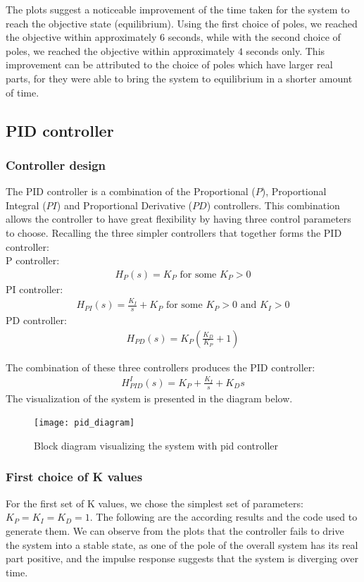 \documentclass [12pt,letterpaper]{exam}
\begin{document}


The plots suggest a noticeable improvement of the time taken for the system to reach the objective state (equilibrium). Using the first choice of poles, we reached the objective within approximately $6$ seconds, while with the second choice of poles, we reached the objective within approximately $4$ seconds only. This improvement can be attributed to the choice of poles which have larger real parts, for they were able to bring the system to equilibrium in a shorter amount of time.

\subsection{PID controller}
\subsubsection{Controller design}
The PID controller is a combination of the Proportional ($P$), Proportional Integral ($PI$) and Proportional Derivative ($PD$) controllers. This combination allows the controller to have great flexibility by having three control parameters to choose. Recalling the three simpler controllers that together forms the PID controller: \\
P controller:
\begin{align}
H_P(s) = K_P \mbox{ for some } K_P > 0
\end{align}
PI controller:
\begin{align}
H_{PI}(s) = \frac{K_I}{s} + K_P \mbox{ for some } K_P > 0 \mbox{ and } K_I > 0
\end{align}
PD controller:
\begin{align}
H_{PD}(s) = K_P(\frac{K_D}{K_P} + 1)
\end{align}

The combination of these three controllers produces the PID controller:
\begin{align}
H^{I}_{PID}(s) = K_P + \frac{K_I}{s} + K_Ds
\end{align}
The visualization of the system is presented in the diagram below.
\begin{figure}[H]
  \centering
    \texttt{[image: pid\_diagram]}
  \caption{Block diagram visualizing the system with pid controller}
  \label{fig:pid_diagram}
\end{figure}

\subsubsection{First choice of K values}
For the first set of K values, we chose the simplest set of parameters: $K_P = K_I = K_D = 1$. The following are the according results and the code used to generate them. We can observe from the plots that the controller fails to drive the system into a stable state, as one of the pole of the overall system has its real part positive, and the impulse response suggests that the system is diverging over time.
\end{document}
